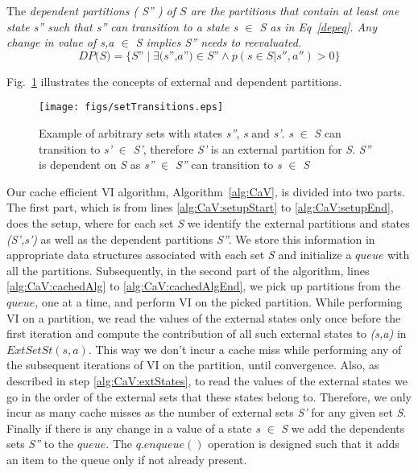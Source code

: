 \documentclass[conference]{IEEEtran}
\begin{document}
The \em{dependent partitions} ( \textit{S''} ) of $S$ are the partitions that contain at least one state \textit{s''} such that \textit{s''} can transition to a state \textit{s} $\in$ \textit{S} as in Eq~\ref{depeq}. Any change in value of \textit{s,a} $\in$ \textit{S} implies \textit{S''} needs to reevaluated.
\begin{equation}
\textit{DP(S)} = \{\textit{S''} \mid \exists \textit{(s'',a'')} \in \textit{S''} \land p(s \in \textit{S}|s'',a'') > 0\} \label{depeq}
\end{equation}

Fig.~\ref{fig} illustrates the concepts of external and dependent partitions.
\begin{figure}[htbp]
\centerline{\texttt{[image: figs/setTransitions.eps]}}
\caption{Example of arbitrary sets with states \textit{s''}, \textit{s} and \textit{s'}. \textit{s} $\in$ \textit{S} can transition to \textit{s'} $\in$ \textit{S'}, therefore \textit{S'} is an external partition for \textit{S}. \textit{S''} is dependent on \textit{S} as \textit{s''} $\in$ \textit{S''} can transition to \textit{s} $\in$ \textit{S}}
\label{fig}
\end{figure}

Our cache efficient VI algorithm, Algorithm~\ref{alg:CaV}, is divided into two parts. The first part, which is from lines \ref{alg:CaV:setupStart} to \ref{alg:CaV:setupEnd}, does the setup, where for each set \textit{S} we identify the external partitions and states \textit{(S',s')} as well as the
dependent partitions \textit{S''}. We store this information in appropriate data structures associated with each set \textit{S} and initialize a $queue$ with all the partitions.  Subsequently, in the second part of the algorithm,
lines \ref{alg:CaV:cachedAlg} to \ref{alg:CaV:cachedAlgEnd}, we pick up partitions from the $queue$, one at a time, and perform VI on the picked partition. While performing VI on a partition, we read the values of the external states only once before the first iteration and compute the contribution of all such external states to \textit{(s,a)} in $ExtSetSt(s,a)$. This way we don't incur a cache miss while performing any of the subsequent iterations of VI on the partition, until convergence. Also, as described in step \ref{alg:CaV:extStates}, to read the values of the external states we go in the order of the external sets that these states belong to. Therefore, we only incur as many cache misses as the number of external sets \textit{S'} for any given set \textit{S}. Finally if there is any change in a value of a state \textit{s} $\in$ \textit{S} we add the dependents sets \textit{S''} to the $queue$. The $q.enqueue()$ operation is designed such that it adds an item to the queue only if not already present.
\end{document}
